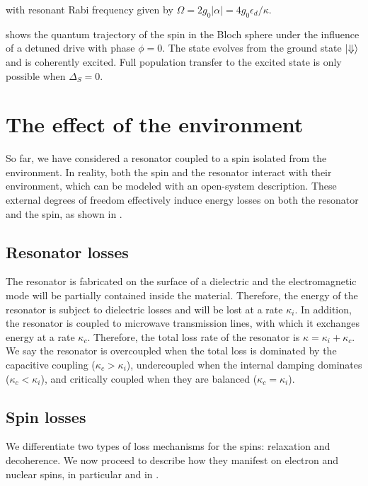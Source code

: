 with resonant Rabi frequency given by $\Omega = 2g_0|\alpha| = 4g_0 \epsilon_d / \kappa$.

 shows the quantum trajectory of the spin in the Bloch sphere under the influence of a detuned drive with phase $\phi=0$. The state evolves from the ground state $\ket{\Downarrow}$ and is coherently excited. Full population transfer to the excited state is only possible when $\Delta_S=0$.


\section{The effect of the environment}

So far, we have considered a resonator coupled to a spin isolated from the environment. In reality, both the spin and the resonator interact with their environment, which can be modeled with an open-system description. These external degrees of freedom effectively induce energy losses on both the resonator and the spin, as shown in . 

\subsection{Resonator losses}

The resonator is fabricated on the surface of a dielectric and the electromagnetic mode will be partially contained inside the material. Therefore, the energy of the resonator is subject to dielectric losses and will be lost at a rate $\kappa_i$. In addition, the resonator is coupled to microwave transmission lines, with which it exchanges energy at a rate $\kappa_c$. Therefore, the total loss rate of the resonator is $\kappa = \kappa_i + \kappa_c$. We say the resonator is overcoupled when the total loss is dominated by the capacitive coupling ($\kappa_c>\kappa_i$), undercoupled when the internal damping dominates ($\kappa_c<\kappa_i$), and critically coupled when they are balanced ($\kappa_c=\kappa_i$).

\subsection{Spin losses}

We differentiate two types of loss mechanisms for the spins: relaxation and decoherence. We now proceed to describe how they manifest on electron and nuclear spins, in particular \Er and \W in \Ca.

